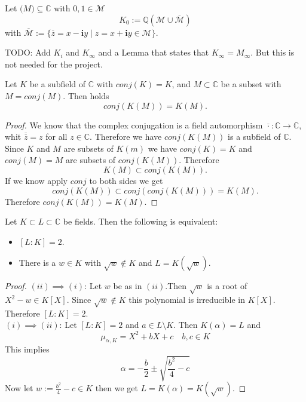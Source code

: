 \begin{definition}
    Let $\mathcal(M)\subseteq\mathbb{C}$ with $0,1 \in \mathcal{M}$
    \begin{equation*}
        K_0 := \mathbb{Q}(\mathcal{M}\cup \overline{\mathcal{M}})
    \end{equation*}
    with $\overline{\mathcal{M}} := \{ \overline{z} = x - \textbf{i}y \mid z = x+\textbf{i}y  \in \mathcal{M} \}$.
\end{definition}

TODO: Add $K_i$ and $K_{\infty}$ and a Lemma that states that $K_{\infty} = M_{\infty}$. But this is not needed for the project.

\begin{lemma}
    \label{lem:conj_of_adjoin}
    Let $K$ be a subfield of $\mathbb{C}$ with $conj(K)=K$, and $ M \subset \mathbb{C}$ be a subset with $M = conj(M)$. Then holds
    \begin{equation*}
        conj(K(M)) = K(M).
    \end{equation*}
\end{lemma}
\begin{proof}
    We know that the complex conjugation is a field automorphism $\overline{\cdot }: \mathbb{C} \to \mathbb{C}$, whit $\overline{\overline{z}} = z$ for all $z \in \mathbb{C}$. Therefore we have
    $conj(K(M))$ is a subfield of $\mathbb{C}$.\\
    Since $K$ and $M$ are subsets of $K(m)$ we have $conj(K) = K$ and $conj(M) = M$ are subsets of $conj(K(M))$. Therefore $$K(M) \subset conj(K(M)).$$
    If we know apply $conj$ to both sides we get
    $$conj(K(M)) \subset conj(conj(K(M))) = K(M).$$
    Therefore $conj(K(M)) = K(M)$.
\end{proof}

\begin{lemma}
    \label{lem:dergee2_iff_adjoint_sqrt}
    Let $K\subset L \subset \mathbb{C}$ be fields. Then the following is equivalent:
    \begin{itemize}
        \item $[L:K] = 2$.
        \item There is a $w \in K$ with $\sqrt{w} \notin K$ and $L = K(\sqrt{w})$.
    \end{itemize}
\end{lemma}
\begin{proof}
    $(ii)\implies (i)$: Let $w$ be as in $(ii)$.Then $\sqrt{w}$ is a root of $X^2 - w \in K[X]$. Since $\sqrt{w} \notin K$ this polynomial is irreducible in $K[X]$. Therefore $[L:K] = 2$.\\
    $(i)\implies (ii)$: Let $[L:K] = 2$ and $a \in L \setminus K$. Then $K(\alpha) = L$ and 
    $$\mu_{\alpha, K}=X^2 + bX + c \quad b,c \in K$$
    This implies 
    $$\alpha = -\frac{b}{2} \pm \sqrt{\frac{b^2}{4} - c} $$
    Now let $w := \frac{b^2}{4} - c \in K$ then we get $L = K(\alpha) = K(\sqrt{w})$.
\end{proof}


